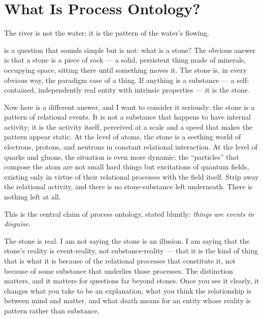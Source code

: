 \chapter{What Is Process Ontology?}
\label{ch:process-ontology}

\epigraph{The river is not the water; it is the pattern of the water's flowing.}{}


 is a question that sounds simple but is not: what is a stone?
The obvious answer is that a stone is a piece of rock --- a solid, persistent
thing made of minerals, occupying space, sitting there until something
moves it.
The stone is, in every obvious way, the paradigm case of a thing.
If anything is a substance --- a self-contained, independently real entity with
intrinsic properties --- it is the stone.

Now here is a different answer, and I want to consider it seriously:
the stone is a pattern of relational events.
It is not a substance that happens to have internal activity; it is the
activity itself, perceived at a scale and a speed that makes the pattern
appear static.
At the level of atoms, the stone is a seething world of electrons, protons,
and neutrons in constant relational interaction.
At the level of quarks and gluons, the situation is even more dynamic: the
``particles'' that compose the atom are not small hard things but excitations
of quantum fields, existing only in virtue of their relational processes with
the field itself.
Strip away the relational activity, and there is no stone-substance left
underneath.
There is nothing left at all.

This is the central claim of process ontology, stated bluntly:
\emph{things are events in disguise.}

The stone is real.
I am not saying the stone is an illusion.
I am saying that the stone's reality is event-reality, not substance-reality ---
that it is the kind of thing that is what it is because of the relational
processes that constitute it, not because of some substance that underlies
those processes.
The distinction matters, and it matters for questions far beyond stones.
Once you see it clearly, it changes what you take to be an explanation,
what you think the relationship is between mind and matter, and what death
means for an entity whose reality is pattern rather than substance.

